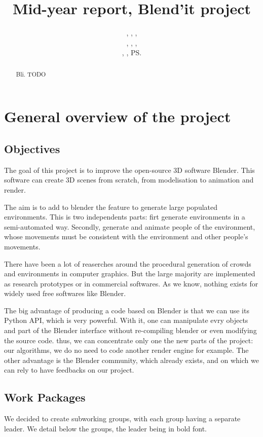 \documentclass[a4paper,11pt]{article}
\title{Mid-year report, Blend'it project}
\author{\bb, \gc, \dl,\\ \vl, \om, \mr,\\ \me, \js, \ps}
\begin{document}
\maketitle

\begin{abstract}
Bli. TODO
\end{abstract}

\tableofcontents

\section{General overview of the project}

\subsection{Objectives}
The goal of this project is to improve the open-source 3D software Blender. This software can create 3D scenes from scratch, from modelisation to animation and render.

The aim is to add to blender the feature to generate large populated environments. This is two independents parts: firt generate environments in a semi-automated way. Secondly, generate and animate people of the environment, whose movements must be consistent with the environment and other people's movements.

There have been a lot of reaserches around the procedural generation of crowds and environments in computer graphics. But the large majority are implemented as research prototypes or in commercial softwares. As we know, nothing exists for widely used free softwares like Blender.

The big advantage of producing a code based on Blender is that we can use its Python API, which is very powerful. With it, one can manipulate evry objects and part of the Blender interface without re-compiling blender or even modifying the source code. thus, we can concentrate only one the new parts of the project: our algorithms, we do no need to code another render engine for example.
The other advantage is the Blender community, which already exists, and on which we can rely to have feedbacks on our project.

\subsection{Work Packages}
We decided to create subworking groups, with each group having a separate leader. We detail below the groups, the leader being in bold font.
\end{document}
